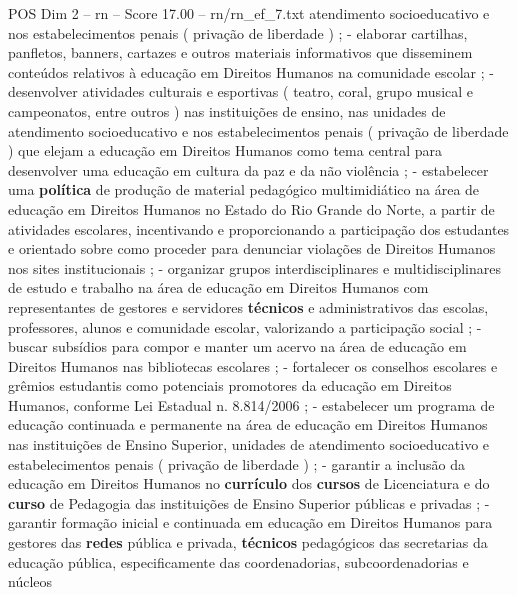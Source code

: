\begin{textsample}{POS Dim 2 – rn – Score 17.00 – rn/rn\_ef\_7.txt}
atendimento socioeducativo e nos estabelecimentos penais ( privação de liberdade ) ; - elaborar cartilhas, panfletos, banners, cartazes e outros materiais informativos que disseminem conteúdos relativos à educação em Direitos Humanos na comunidade escolar ; - desenvolver atividades culturais e esportivas ( teatro, coral, grupo musical e campeonatos, entre outros ) nas instituições de ensino, nas unidades de atendimento socioeducativo e nos estabelecimentos penais ( privação de liberdade ) que elejam a educação em Direitos Humanos como tema central para desenvolver uma educação em cultura da paz e da não violência ; - estabelecer uma \textbf{política} de produção de material pedagógico multimidiático na área de educação em Direitos Humanos no Estado do Rio Grande do Norte, a partir de atividades escolares, incentivando e proporcionando a participação dos estudantes e orientado sobre como proceder para denunciar violações de Direitos Humanos nos sites institucionais ; - organizar grupos interdisciplinares e multidisciplinares de estudo e trabalho na área de educação em Direitos Humanos com representantes de gestores e servidores \textbf{técnicos} e administrativos das escolas, professores, alunos e comunidade escolar, valorizando a participação social ; - buscar subsídios para compor e manter um acervo na área de educação em Direitos Humanos nas bibliotecas escolares ; - fortalecer os conselhos escolares e grêmios estudantis como potenciais promotores da educação em Direitos Humanos, conforme Lei Estadual n. 8.814/2006 ; - estabelecer um programa de educação continuada e permanente na área de educação em Direitos Humanos nas instituições de Ensino Superior, unidades de atendimento socioeducativo e estabelecimentos penais ( privação de liberdade ) ; - garantir a inclusão da educação em Direitos Humanos no \textbf{currículo} dos \textbf{cursos} de Licenciatura e do \textbf{curso} de Pedagogia das instituições de Ensino Superior públicas e privadas ; - garantir formação inicial e continuada em educação em Direitos Humanos para gestores das \textbf{redes} pública e privada, \textbf{técnicos} pedagógicos das secretarias da educação pública, especificamente das coordenadorias, subcoordenadorias e núcleos

\end{textsample}

